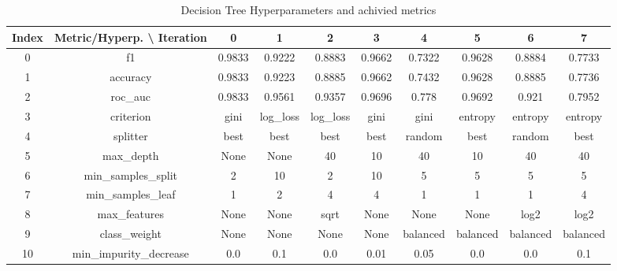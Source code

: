 \documentclass{article}%
\begin{document}
\begin{table}[h!]%
\caption{Decision Tree Hyperparameters and achivied metrics}%
\vspace{0.2cm}%
\centering%
\begin{tabular}{|c||c||c||c||c||c||c||c||c||c|}%
\hline%
Index&Metric/Hyperp. \textbackslash{} Iteration&0&1&2&3&4&5&6&7\\%
\hline%
0&f1&0.9833&0.9222&0.8883&0.9662&0.7322&0.9628&0.8884&0.7733\\%
1&accuracy&0.9833&0.9223&0.8885&0.9662&0.7432&0.9628&0.8885&0.7736\\%
2&roc\_auc&0.9833&0.9561&0.9357&0.9696&0.778&0.9692&0.921&0.7952\\%
3&criterion&gini&log\_loss&log\_loss&gini&gini&entropy&entropy&entropy\\%
4&splitter&best&best&best&best&random&best&random&best\\%
5&max\_depth&None&None&40&10&40&10&40&40\\%
6&min\_samples\_split&2&10&2&10&5&5&5&5\\%
7&min\_samples\_leaf&1&2&4&4&1&1&1&4\\%
8&max\_features&None&None&sqrt&None&None&None&log2&log2\\%
9&class\_weight&None&None&None&None&balanced&balanced&balanced&balanced\\%
10&min\_impurity\_decrease&0.0&0.1&0.0&0.01&0.05&0.0&0.0&0.1\\%
\hline%
\end{tabular}%
\end{table}

%
\end{document}
